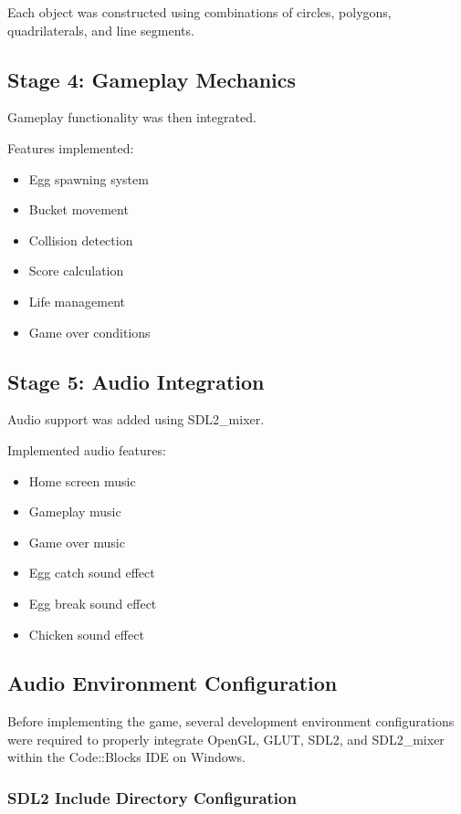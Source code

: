 \documentclass[12pt,a4paper]{report}
\begin{document}
Each object was constructed using combinations of circles, polygons, quadrilaterals, and line segments.

\subsection*{Stage 4: Gameplay Mechanics}

Gameplay functionality was then integrated.

Features implemented:

\begin{itemize}
\item Egg spawning system
\item Bucket movement
\item Collision detection
\item Score calculation
\item Life management
\item Game over conditions
\end{itemize}

\subsection*{Stage 5: Audio Integration}

Audio support was added using SDL2\_mixer.

Implemented audio features:

\begin{itemize}
\item Home screen music
\item Gameplay music
\item Game over music
\item Egg catch sound effect
\item Egg break sound effect
\item Chicken sound effect
\end{itemize}

\subsection{Audio Environment Configuration}

Before implementing the game, several development environment configurations were required to properly integrate OpenGL, GLUT, SDL2, and SDL2\_mixer within the Code::Blocks IDE on Windows.

\subsubsection*{SDL2 Include Directory Configuration}
\end{document}
